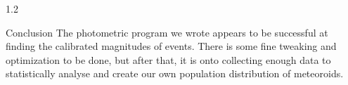 \documentclass[final]{beamer}
\newlength{\twocolwid}
\begin{document}
\begin{frame}[t]
\begin{columns}[t]
\begin{column}{1.2\twocolwid}
\begin{block}{Conclusion}
The photometric program we wrote appears to be successful at finding the calibrated magnitudes of events. There is some fine tweaking and optimization to be done, but after that, it is onto collecting enough data to statistically analyse and create our own population distribution of meteoroids. 

\end{block}

















\end{column}
\end{columns}
\end{frame}
\end{document}
